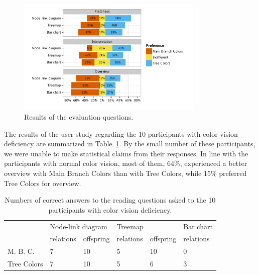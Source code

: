 \documentclass[journal]{vgtc}                %
\begin{document}
\begin{figure}[!t]
  \centering
	\includegraphics[width=3.5in]{user_study_results2.pdf}
    \vspace{-6ex}
  \caption{Results of the evaluation questions.}\label{fig:user2}
    \vspace{-3ex}

\end{figure}



The results of the user study regarding the 10 participants with color vision deficiency are summarized in Table~\ref{table:userCB}. By the small number of these participants, we were unable to make statistical claims from their responses. In line with the participants with normal color vision, most of them, 64\%, experienced a better overview with Main Branch Colors than with Tree Colors, while 15\% preferred Tree Colors for overview.

\begin{table}[!htb]
\begin{footnotesize}
\begin{center}
\begin{tabular}{llllll}
\toprule
& \multicolumn{2}{l}{Node-link diagram} & \multicolumn{2}{l}{Treemap} & Bar chart\\
& relations & offspring & relations & offspring & relations\\
\midrule
M. B. C. & 7 & 10 & 5 & 10 & 0\\
Tree Colors & 7 & 10 & 5 & 6 & 3\\
\bottomrule
\end{tabular}
    \vspace{-4ex}

\end{center}
\end{footnotesize}
\caption{Numbers of correct answers to the reading questions asked to the 10 participants with color vision deficiency.}\label{table:userCB}
    \vspace{-2ex}
\end{table}
\end{document}
